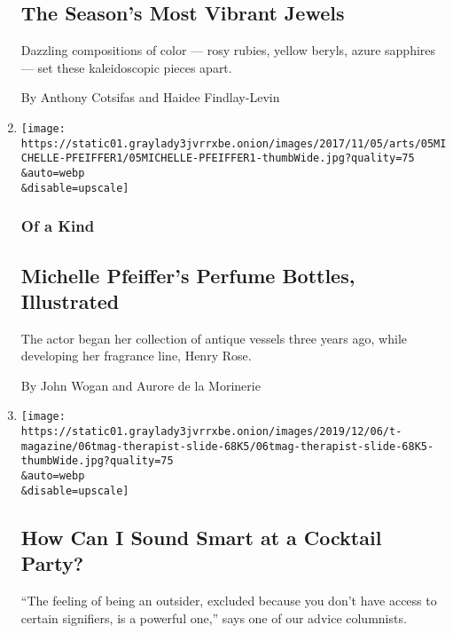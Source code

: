 \begin{enumerate}
  \hypertarget{the-seasons-most-vibrant-jewels}{%
  \subsection{The Season's Most Vibrant
  Jewels}\label{the-seasons-most-vibrant-jewels}}

  Dazzling compositions of color --- rosy rubies, yellow beryls, azure
  sapphires --- set these kaleidoscopic pieces apart.

  By Anthony Cotsifas and Haidee Findlay-Levin
\item
  \href{/2019/12/06/t-magazine/michelle-pfeiffer-perfume-bottles.html}{}

  \texttt{[image: https://static01.graylady3jvrrxbe.onion/images/2017/11/05/arts/05MICHELLE-PFEIFFER1/05MICHELLE-PFEIFFER1-thumbWide.jpg?quality=75\\\&auto=webp\\\&disable=upscale]}

  \hypertarget{of-a-kind}{%
  \subsubsection{Of a Kind}\label{of-a-kind}}

  \hypertarget{michelle-pfeiffers-perfume-bottles-illustrated}{%
  \subsection{Michelle Pfeiffer's Perfume Bottles,
  Illustrated}\label{michelle-pfeiffers-perfume-bottles-illustrated}}

  The actor began her collection of antique vessels three years ago,
  while developing her fragrance line, Henry Rose.

  By John Wogan and Aurore de la Morinerie
\item
  \href{/2019/12/06/t-magazine/cocktail-party-tips.html}{}

  \texttt{[image: https://static01.graylady3jvrrxbe.onion/images/2019/12/06/t-magazine/06tmag-therapist-slide-68K5/06tmag-therapist-slide-68K5-thumbWide.jpg?quality=75\\\&auto=webp\\\&disable=upscale]}

  \hypertarget{how-can-i-sound-smart-at-a-cocktail-party}{%
  \subsection{How Can I Sound Smart at a Cocktail
  Party?}\label{how-can-i-sound-smart-at-a-cocktail-party}}

  ``The feeling of being an outsider, excluded because you don't have
  access to certain signifiers, is a powerful one,'' says one of our
  advice columnists.


\end{enumerate}
